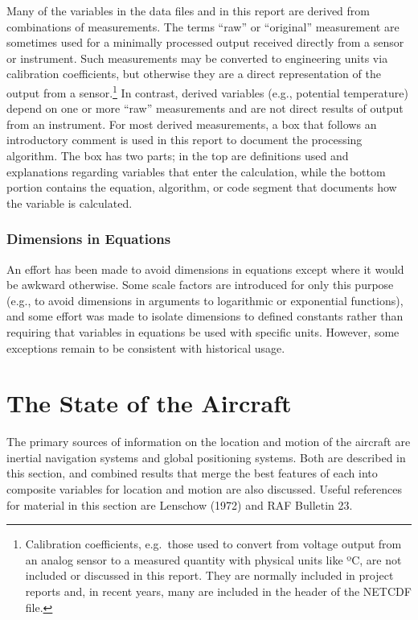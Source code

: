 \documentclass[
  english,
]{book}
\begin{document}
Many of the variables in the data files and in this report are derived
from combinations of measurements. The terms ``raw'' or ``original''
measurement are sometimes used for a minimally processed output received
directly from a sensor or instrument. Such measurements may be converted
to engineering units via calibration coefficients, but otherwise they
are a direct representation of the output from a sensor.\footnote{Calibration
  coefficients, e.g.~those used to convert from voltage output from an
  analog sensor to a measured quantity with physical units like {º}C,
  are not included or discussed in this report. They are normally
  included in project reports and, in recent years, many are included in
  the header of the NETCDF file.} In contrast, derived variables (e.g.,
potential temperature) depend on one or more ``raw'' measurements and
are not direct results of output from an instrument. For most derived
measurements, a box that follows an introductory comment is used in this
report to document the processing algorithm. The box has two parts; in
the top are definitions used and explanations regarding variables that
enter the calculation, while the bottom portion contains the equation,
algorithm, or code segment that documents how the variable is
calculated.

\hypertarget{dimensions-in-equations}{%
\subsection{Dimensions in Equations}\label{dimensions-in-equations}}

An effort has been made to avoid dimensions in equations except where it
would be awkward otherwise. Some scale factors are introduced for only
this purpose (e.g., to avoid dimensions in arguments to logarithmic or
exponential functions), and some effort was made to isolate dimensions
to defined constants rather than requiring that variables in equations
be used with specific units. However, some exceptions remain to be
consistent with historical usage.

\hypertarget{the-state-of-the-aircraft}{%
\chapter{The State of the Aircraft}\label{the-state-of-the-aircraft}}

The primary sources of information on the location and motion of the
aircraft are inertial navigation systems and global positioning systems.
Both are described in this section, and combined results that merge the
best features of each into composite variables for location and motion
are also discussed. Useful references for material in this section are
Lenschow (1972) and RAF Bulletin 23.
\end{document}
